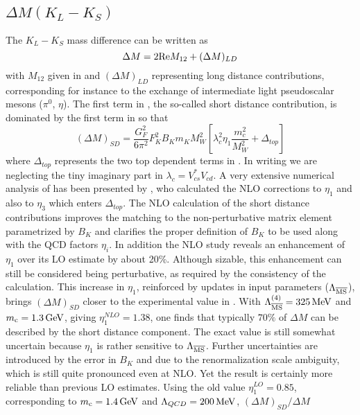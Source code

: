 \subsection{$\Delta M(K_L-K_S)$}
            \label{sec:mki12:mk}
The $K_L-K_S$ mass difference can be written as
\begin{equation}\label{2rem12}
\Delta M=2 {\rm Re} M_{12}+(\Delta M)_{LD}
\end{equation}
with $M_{12}$ given in  and $(\Delta M)_{LD}$
representing long distance contributions, corresponding for instance to
the exchange of intermediate light pseudoscalar mesons ($\pi^0$,
$\eta$). The first term in , the so-called short distance
contribution, is dominated by the first term in  so that
\begin{equation}\label{dmsd}
(\Delta M)_{SD}=\frac{G^2_F}{6\pi^2}F^2_K B_K m_K M^2_W
\left[ \lambda^2_c\eta_1\frac{m^2_c}{M^2_W}+\Delta_{top}\right]
\end{equation}
where $\Delta_{top}$ represents the two top dependent terms in
. In writing  we are neglecting the tiny
imaginary part in $\lambda_c=V^*_{cs}V_{cd}$. A very extensive
numerical analysis of  has been presented by
\cite{herrlichnierste:93}, who calculated the NLO corrections to
$\eta_1$ and also to $\eta_3$ \cite{herrlichnierste:95} which enters
$\Delta_{top}$.  The NLO calculation of the short distance
contributions improves the matching to the non-perturbative matrix
element parametrized by $B_K$ and clarifies the proper definition of
$B_K$ to be used along with the QCD factors $\eta_i$. In addition the
NLO study reveals an enhancement of $\eta_1$ over its LO estimate by
about 20\%. Although sizable, this enhancement can still be considered
being perturbative, as required by the consistency of the calculation.
This increase in $\eta_1$, reinforced by updates in input parameters
($\Lambda_{\overline{\rm MS}}$), brings $(\Delta M)_{SD}$ closer to the experimental value in
.  With $\Lambda_{\overline{\rm MS}}^{(4)}=325\, {\rm MeV}$ and $m_{\rm c}=1.3\, {\rm GeV}$, giving
$\eta^{NLO}_1=1.38$, one finds that typically $70\%$ of $\Delta M$ can
be described by the short distance component. The exact value is still
somewhat uncertain because $\eta_1$ is rather sensitive to $\Lambda_{\overline{\rm MS}}$.
Further uncertainties are introduced by the error in $B_K$ and due to
the renormalization scale ambiguity, which is still quite pronounced
even at NLO. Yet the result is certainly more reliable than previous LO
estimates.  Using the old value $\eta^{LO}_1=0.85$, corresponding to
$m_{\rm c}=1.4\, {\rm GeV}$ and $\Lambda_{QCD}=200\, {\rm MeV}$, $(\Delta M)_{SD}/\Delta M$
